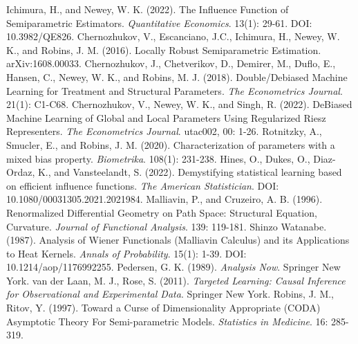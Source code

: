 \documentclass[uplatex, dvipdfmx]{jsarticle}
\begin{document}
\begin{thebibliography}{99}
    Ichimura, H., and Newey, W. K. (2022). The Influence Function of Semiparametric Estimators. \textit{Quantitative Economics}. 13(1): 29-61. DOI: 10.3982/QE826.
    Chernozhukov, V., Escanciano, J.C., Ichimura, H., Newey, W. K., and Robins, J. M. (2016). Locally Robust Semiparametric Estimation. arXiv:1608.00033.
    Chernozhukov, J., Chetverikov, D., Demirer, M., Duflo, E., Hansen, C., Newey, W. K., and Robins, M. J. (2018). Double/Debiased Machine Learning for Treatment and Structural Parameters. \textit{The Econometrics Journal}. 21(1): C1-C68.
    Chernozhukov, V., Newey, W. K., and Singh, R. (2022). DeBiased Machine Learning of Global and Local Parameters Using Regularized Riesz Representers. \textit{The Econometrics Journal}. utac002, 00: 1-26.
    Rotnitzky, A., Smucler, E., and Robins, J. M. (2020). Characterization of parameters with a mixed bias property. \textit{Biometrika}. 108(1): 231-238.
    Hines, O., Dukes, O., Diaz-Ordaz, K., and Vansteelandt, S. (2022). Demystifying statistical learning based on efficient influence functions. \textit{The American Statistician}. DOI: 10.1080/00031305.2021.2021984.
    Malliavin, P., and Cruzeiro, A. B. (1996). Renormalized Differential Geometry on Path Space: Structural Equation, Curvature. \textit{Journal of Functional Analysis}. 139: 119-181.
    Shinzo Watanabe. (1987). Analysis of Wiener Functionals (Malliavin Calculus) and its Applications to Heat Kernels. \textit{Annals of Probability}. 15(1): 1-39. DOI: 10.1214/aop/1176992255.
    Pedersen, G. K. (1989). \textit{Analysis Now}. Springer New York.
    van der Laan, M. J., Rose, S. (2011). \textit{Targeted Learning: Causal Inference for Observational and Experimental Data}. Springer New York.
    Robins, J. M., Ritov, Y. (1997). Toward a Curse of Dimensionality Appropriate (CODA) Asymptotic Theory For Semi-parametric Models. \textit{Statistics in Medicine}. 16: 285-319.
\end{thebibliography}
\end{document}
